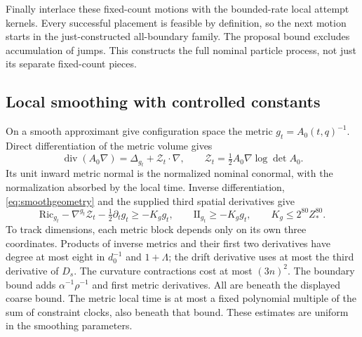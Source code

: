 \documentclass[11pt]{article}
\numberwithin{equation}{section}
\theoremstyle{definition}
\theoremstyle{remark}\newtheorem{remark}[theorem]{Remark}
\begin{document}
Finally interlace these fixed-count motions with the bounded-rate local
attempt kernels. Every successful placement is feasible by definition, so
the next motion starts in the just-constructed all-boundary family. The
proposal bound excludes accumulation of jumps. This constructs the full
nominal particle process, not just its separate fixed-count pieces.

\subsection{Local smoothing with controlled constants}

On a smooth approximant give configuration space the metric
$g_t=A_0(t,q)^{-1}$. Direct differentiation of the metric volume gives
\begin{equation}\label{eq:metricgenerator}
 \operatorname{div}(A_0\nabla)=\Delta_{g_t}+\mathcal Z_t\cdot\nabla,
 \qquad \mathcal Z_t=\tfrac12A_0\nabla\log\det A_0.
\end{equation}
Its unit inward metric normal is the normalized nominal conormal, with
the normalization absorbed by the local time. Inverse differentiation,
\eqref{eq:smoothgeometry} and the supplied third spatial derivatives give
\begin{equation}\label{eq:curvaturebounds}
 \mathrm{Ric}_{g_t}-\nabla^{g_t}\mathcal Z_t
                -\tfrac12\partial_tg_t\ge-K_g g_t,
 \qquad \mathrm{II}_{g_t}\ge-K_g g_t,
 \qquad K_g\le2^{80}Z_*^{80}.
\end{equation}
To track dimensions, each metric block depends only on its own three
coordinates. Products of inverse metrics and their first two derivatives
have degree at most eight in $d_0^{-1}$ and $1+\Lambda$; the drift
derivative uses at most the third derivative of $D_s$. The curvature
contractions cost at most $(3n)^2$. The boundary bound adds
$\alpha^{-1}\rho^{-1}$ and first metric derivatives. All are beneath
the displayed coarse bound. The metric local time is at most a fixed
polynomial multiple of the sum of constraint clocks, also beneath that
bound. These estimates are uniform in the smoothing parameters.
\end{document}
